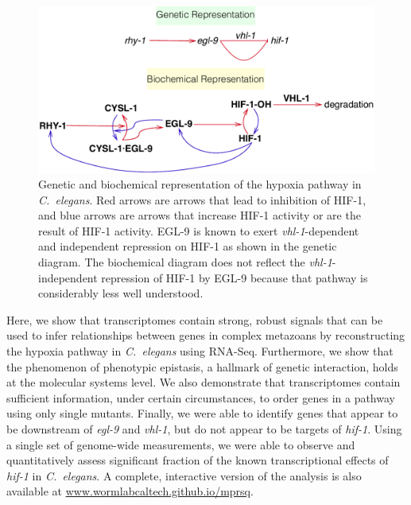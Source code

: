 \documentclass[9pt,twocolumn,twoside]{pnas-new}
\newcommand{\cel}{\emph{C.~elegans}}
\newcommand{\gene}[1]{\emph{#1}}
\newcommand{\egl}{\emph{egl-9~(lf)}}
\newcommand{\rhy}{\emph{rhy-1~(lf)}}
\newcommand{\eglp}{EGL-9}
\newcommand{\rhyp}{RHY-1}
\newcommand{\vhlp}{VHL-1}
\newcommand{\hifp}{HIF-1}
\begin{document}
\begin{figure}[tbhp]
\centering
\includegraphics[width=\linewidth]{figs/HIF1pathway.pdf}
\caption{
Genetic and biochemical representation of the hypoxia pathway in \cel{}.
Red arrows are arrows that lead to inhibition of \hifp{}, and blue arrows
are arrows that increase \hifp{} activity or are the result of \hifp{} activity.
\eglp{} is known to exert \gene{vhl-1}-dependent and independent repression
on \hifp{} as shown in the genetic diagram. The biochemical diagram does not
reflect the \gene{vhl-1}-independent repression of \hifp{} by \eglp{} because
that pathway is considerably less well understood.
}
\label{fig:pathway}
\end{figure}


Here, we show that transcriptomes contain strong, robust signals that can be
used to infer relationships between genes in complex metazoans by reconstructing
the hypoxia pathway in \cel{} using RNA-Seq.
Furthermore, we show that the phenomenon of phenotypic epistasis, a hallmark of
genetic interaction, holds at the molecular systems level.
We also demonstrate that transcriptomes contain sufficient information, under
certain circumstances, to order genes in a pathway using only single mutants.
Finally, we were able to identify genes that appear to be downstream of \gene{egl-9}
and \gene{vhl-1}, but do not appear to be targets of \gene{hif-1}.
Using a single set of genome-wide measurements, we were able to observe and
quantitatively assess  significant fraction of the known transcriptional
effects of \gene{hif-1} in \cel{}.
A complete, interactive version of the analysis is also available at
\url{www.wormlabcaltech.github.io/mprsq}.
\end{document}
